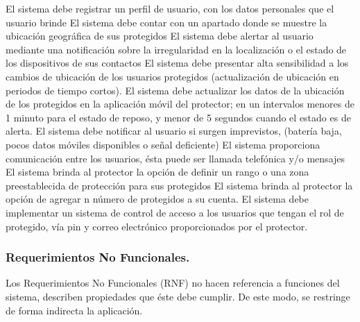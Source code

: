 \documentclass[10pt]{article}
\begin{document}
\begin{cdtRequirements}[version=1.0, author=Rodolfo, status=En espera de revisión, revisor=Ulises]
	{El sistema debe registrar un perfil de usuario, con los datos personales que el usuario brinde}
	{El sistema debe contar con un apartado donde se muestre la ubicación geográfica de sus protegidos}
	{El sistema debe alertar al usuario mediante una notificación sobre la irregularidad en la localización o el estado de los dispositivos de sus contactos}
	{El sistema debe presentar alta sensibilidad a los cambios de ubicación de los usuarios protegidos (actualización de ubicación en periodos de tiempo cortos).}
	{El sistema debe actualizar los datos de la ubicación de los protegidos en la aplicación móvil del protector; en un intervalos menores de 1 minuto para el estado de reposo, y menor de 5 segundos cuando el estado es de alerta.}
	{El sistema debe notificar al usuario si surgen imprevistos, (batería baja, pocos datos móviles disponibles o señal deficiente)}
	{El sistema proporciona comunicación entre los usuarios, ésta puede ser llamada telefónica y/o mensajes}
	{El sistema brinda al protector la opción de definir un rango o una zona preestablecida de protección para sus protegidos}
	{El sistema brinda al protector  la opción de  agregar n número de protegidos a su cuenta.}
	{El sistema debe implementar un sistema de control de acceso a los usuarios que tengan el rol de protegido, vía pin y correo electrónico  proporcionados por el protector.}
	
	
\end{cdtRequirements}
\newpage 
\subsubsection{Requerimientos No Funcionales.}
Los Requerimientos No Funcionales (RNF) no hacen referencia a funciones del sistema, describen propiedades que éste debe cumplir. De este modo, se restringe de forma indirecta la aplicación.\\
\end{document}
